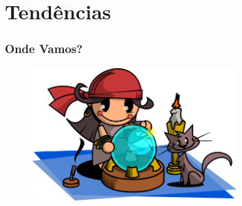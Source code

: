 \documentclass[hyperref={pdfpagelabels=true}]{beamer}
\begin{document}




\section{Tend\^{e}ncias} 
\begin{frame}
\frametitle{Onde Vamos?}

    \begin{figure}   
         \includegraphics[width=0.7\textwidth]{fortune-teller.png}   
    \end{figure}     

\end{frame}
\end{document}
